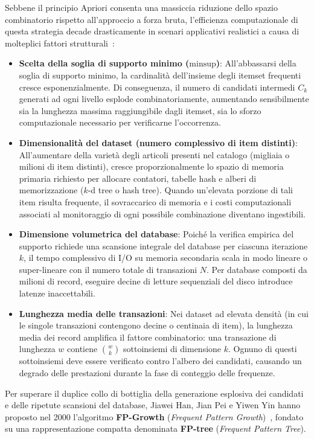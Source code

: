 Sebbene il principio Apriori consenta una massiccia riduzione dello spazio combinatorio rispetto all'approccio a forza bruta, l'efficienza computazionale di questa strategia decade drasticamente in scenari applicativi realistici a causa di molteplici fattori strutturali~\cite{tan2018, han2000, han2011}:
\begin{itemize}
    \item \textbf{Scelta della soglia di supporto minimo ($\text{minsup}$)}: All'abbassarsi della soglia di supporto minimo, la cardinalità dell'insieme degli itemset frequenti cresce esponenzialmente. Di conseguenza, il numero di candidati intermedi $C_k$ generati ad ogni livello esplode combinatoriamente, aumentando sensibilmente sia la lunghezza massima raggiungibile dagli itemset, sia lo sforzo computazionale necessario per verificarne l'occorrenza.
    \item \textbf{Dimensionalità del dataset (numero complessivo di item distinti)}: All'aumentare della varietà degli articoli presenti nel catalogo (migliaia o milioni di item distinti), cresce proporzionalmente lo spazio di memoria primaria richiesto per allocare contatori, tabelle hash e alberi di memorizzazione ($k$-d tree o hash tree). Quando un'elevata porzione di tali item risulta frequente, il sovraccarico di memoria e i costi computazionali associati al monitoraggio di ogni possibile combinazione diventano ingestibili.
    \item \textbf{Dimensione volumetrica del database}: Poiché la verifica empirica del supporto richiede una scansione integrale del database per ciascuna iterazione $k$, il tempo complessivo di I/O su memoria secondaria scala in modo lineare o super-lineare con il numero totale di transazioni $N$. Per database composti da milioni di record, eseguire decine di letture sequenziali del disco introduce latenze inaccettabili.
    \item \textbf{Lunghezza media delle transazioni}: Nei dataset ad elevata densità (in cui le singole transazioni contengono decine o centinaia di item), la lunghezza media dei record amplifica il fattore combinatorio: una transazione di lunghezza $w$ contiene $\binom{w}{k}$ sottoinsiemi di dimensione $k$. Ognuno di questi sottoinsiemi deve essere verificato contro l'albero dei candidati, causando un degrado delle prestazioni durante la fase di conteggio delle frequenze.
\end{itemize}

Per superare il duplice collo di bottiglia della generazione esplosiva dei candidati e delle ripetute scansioni del database, Jiawei Han, Jian Pei e Yiwen Yin hanno proposto nel 2000 l'algoritmo \textbf{FP-Growth} (\textit{Frequent Pattern Growth})~\cite{han2000, han2011}, fondato su una rappresentazione compatta denominata \textbf{FP-tree} (\textit{Frequent Pattern Tree}).

